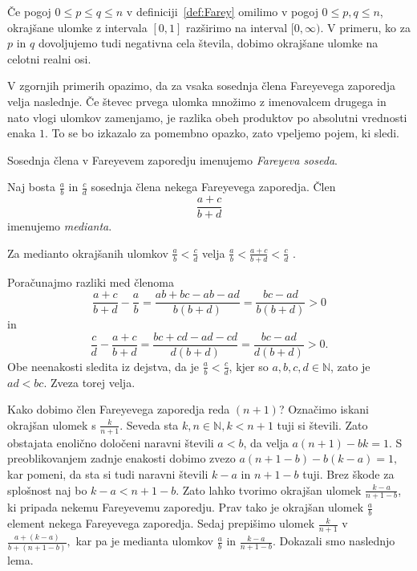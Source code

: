 \documentclass[mat1]{fmfdelo}
\begin{document}
\begin{opomba}
Če pogoj $0 \leq p \leq q \leq n$ v definiciji~\ref{def:Farey} omilimo v pogoj $0 \leq p,q \leq n$, okrajšane ulomke z intervala $[0,1]$ razširimo na interval $[0, \infty)$. V primeru, ko za $p$ in $q$ dovoljujemo tudi negativna cela števila, dobimo okrajšane ulomke na celotni realni osi.
\end{opomba}

V zgornjih primerih opazimo, da za vsaka sosednja člena Fareyevega zaporedja velja naslednje. Če števec prvega ulomka množimo z imenovalcem drugega in nato vlogi ulomkov zamenjamo, je razlika obeh produktov po absolutni vrednosti enaka $1$. To se bo izkazalo za pomembno opazko, zato vpeljemo pojem, ki sledi.

\begin{definicija}
Sosednja člena v Fareyevem zaporedju imenujemo \emph{Fareyeva soseda}.
\end{definicija}

%
\begin{definicija}
Naj bosta $\frac{a}{b}$ in $\frac{c}{d}$ sosednja člena nekega Fareyevega zaporedja. Člen \[\frac{a+c}{b+d} \] imenujemo \emph{medianta}.
\end{definicija}

\begin{trditev}
Za medianto okrajšanih ulomkov \(\frac{a}{b} < \frac{c}{d}\) velja  \(\frac{a}{b} < \frac{a+c}{b+d} < \frac{c}{d}\) .
\end{trditev}

\begin{dokaz}
Poračunajmo razliki med členoma
\[\frac{a+c}{b+d} - \frac{a}{b} = \frac{ab+bc-ab-ad}{b(b+d)} = \frac{bc-ad}{b(b+d)} > 0\] in
\[\frac{c}{d} - \frac{a+c}{b+d} = \frac{bc+cd-ad-cd}{d(b+d)} = \frac{bc-ad}{d(b+d)} > 0.\]
Obe neenakosti sledita iz dejstva, da je \(\frac{a}{b} < \frac{c}{d}\), kjer so \(a, b, c, d \in \mathbb{N} \), zato je \( ad < bc.\)
Zveza torej velja. 
\end{dokaz}

%
Kako dobimo člen Fareyevega zaporedja reda $(n+1)$?
Označimo iskani okrajšan ulomek s $\frac{k}{n+1}$. Seveda sta $k, n \in\mathbb{N}, k < n+1$ tuji si števili. Zato obstajata enolično določeni naravni števili $a < b$, da velja $a(n+1)-bk=1.$ S preoblikovanjem zadnje enakosti dobimo zvezo $a(n+1-b)-b(k-a)=1,$ kar pomeni, da sta si tudi naravni števili $k-a$ in $n+1-b$ tuji. Brez škode za splošnost naj bo $k-a<n+1-b.$ Zato lahko tvorimo okrajšan ulomek $\frac{k-a}{n+1-b}$, ki pripada nekemu Fareyevemu zaporedju. Prav tako je okrajšan ulomek $\frac{a}{b}$ element nekega Fareyevega zaporedja. Sedaj prepišimo ulomek $\frac{k}{n+1}$ v $\frac{a+(k-a)}{b+(n+1-b)},$ kar pa je medianta ulomkov $\frac{a}{b}$ in $\frac{k-a}{n+1-b}.$ Dokazali smo naslednjo lema.
\end{document}
